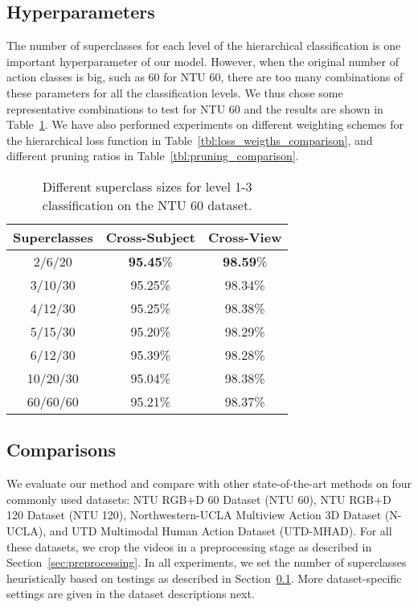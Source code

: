 \documentclass{article}
\begin{document}
\subsection{Hyperparameters}
\label{sec:hyperparameters}
{The number of superclasses for each level of the hierarchical classification is one important hyperparameter of our model. However, when the original number of action classes is big, such as 60 for NTU 60, there are too many combinations of these parameters for all the classification levels. We thus chose some representative combinations to test for NTU 60 and the results are shown in Table~\ref{tbl:super_class_comparison}. We have also performed experiments on different weighting schemes for the hierarchical loss function in Table~\ref{tbl:loss_weigths_comparison}, and different pruning ratios in Table~\ref{tbl:pruning_comparison}.}


\begin{table}
\begin{center}
\caption{Different superclass sizes for level 1-3 classification on the NTU 60 dataset.}
\label{tbl:super_class_comparison}
\begin{tabular}{|c|c|c|}
\hline
Superclasses & Cross-Subject & Cross-View\\
\hline
2/6/20 & \textbf{95.45}\% & \textbf{98.59}\% \\
3/10/30 & 95.25\% & 98.34\%\\
4/12/30 & 95.25\% & 98.38\%\\
5/15/30 & 95.20\% & 98.29\%\\
6/12/30 & 95.39\% & 98.28\%\\
10/20/30 & 95.04\% & 98.38\%\\
60/60/60 & 95.21\% & 98.37\%\\
\hline

\end{tabular}
\end{center}
\end{table}





\subsection{Comparisons}

{We evaluate our method and compare with other state-of-the-art methods on four commonly used datasets: NTU RGB+D 60  Dataset (NTU 60), NTU RGB+D 120 Dataset (NTU 120), Northwestern-UCLA Multiview Action 3D Dataset (N-UCLA), and UTD Multimodal Human Action Dataset (UTD-MHAD). For all these datasets, we crop the videos in a preprocessing stage as described in Section~\ref{sec:preprocessing}. In all experiments, we set the number of superclasses heuristically based on testings as described in Section~\ref{sec:hyperparameters}. More dataset-specific settings are given in the dataset descriptions next.}
\end{document}
